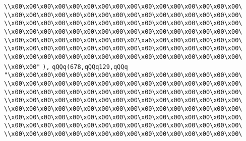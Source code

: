 \verb|\\x00\x00\x00\x00\x00\x00\x00\x00\x00\x00\x00\x00\x00\x00\x00\x00\|\newline
\verb|\\x00\x00\x00\x00\x00\x00\x00\x00\x00\x00\x00\x00\x00\x00\x00\x00\|\newline
\verb|\\x00\x00\x00\x00\x00\x00\x00\x00\x00\x00\x00\x00\x00\x00\x00\x00\|\newline
\verb|\\x00\x00\x00\x00\x00\x00\x00\x00\x00\x00\x00\x00\x00\x00\x00\x00\|\newline
\verb|\\x00\x00\x00\x00\x00\x00\x00\x00\x02\xa6\x00\x00\x00\x00\x00\x00\|\newline
\verb|\\x00\x00\x00\x00\x00\x00\x00\x00\x00\x00\x00\x00\x00\x00\x00\x00\|\newline
\verb|\\x00\x00\x00\x00\x00\x00\x00\x00\x00\x00\x00\x00\x00\x00\x00\x00\|\newline
\verb|\\x00\x00"|\newline
\verb|),|\newline
\verb|qQQq(678,qQQq129,qQQq|\newline
\verb|"\x00\x00\x00\x00\x00\x00\x00\x00\x00\x00\x00\x00\x00\x00\x00\x00\|\newline
\verb|\\x00\x00\x00\x00\x00\x00\x00\x00\x00\x00\x00\x00\x00\x00\x00\x00\|\newline
\verb|\\x00\x00\x00\x00\x00\x00\x00\x00\x00\x00\x00\x00\x00\x00\x00\x00\|\newline
\verb|\\x00\x00\x00\x00\x00\x00\x00\x00\x00\x00\x00\x00\x00\x00\x00\x00\|\newline
\verb|\\x00\x00\x00\x00\x00\x00\x00\x00\x00\x00\x00\x00\x00\x00\x00\x00\|\newline
\verb|\\x00\x00\x00\x00\x00\x00\x00\x00\x00\x00\x00\x00\x00\x00\x00\x00\|\newline
\verb|\\x00\x00\x00\x00\x00\x00\x00\x00\x00\x00\x00\x00\x00\x00\x00\x00\|\newline
\verb|\\x00\x00\x00\x00\x00\x00\x00\x00\x00\x00\x00\x00\x00\x00\x00\x00\|\newline
